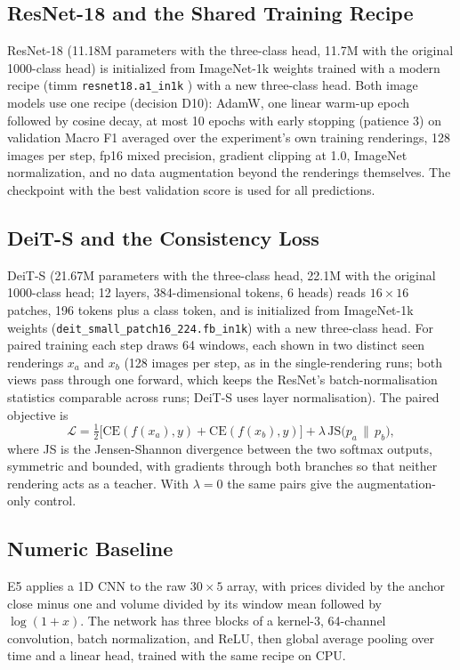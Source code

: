 \documentclass[10pt,journal,compsoc]{IEEEtran}
\begin{document}
\subsection{ResNet-18 and the Shared Training Recipe}
ResNet-18 \cite{he2016resnet} (11.18M parameters with the three-class head, 11.7M with the original 1000-class head) is initialized from ImageNet-1k weights trained with a modern recipe (timm \texttt{resnet18.a1\_in1k} \cite{wightman2019timm, wightman2021resnet}) with a new three-class head. Both image models use one recipe (decision D10): AdamW, one linear warm-up epoch followed by cosine decay, at most 10 epochs with early stopping (patience 3) on validation Macro F1 averaged over the experiment's own training renderings, 128 images per step, fp16 mixed precision, gradient clipping at 1.0, ImageNet normalization, and no data augmentation beyond the renderings themselves. The checkpoint with the best validation score is used for all predictions.

\subsection{DeiT-S and the Consistency Loss}
DeiT-S \cite{touvron2021deit} (21.67M parameters with the three-class head, 22.1M with the original 1000-class head; 12 layers, 384-dimensional tokens, 6 heads) reads $16 \times 16$ patches, 196 tokens plus a class token, and is initialized from ImageNet-1k weights (\texttt{deit\_small\_patch16\_224.fb\_in1k}) with a new three-class head. For paired training each step draws 64 windows, each shown in two distinct seen renderings $x_a$ and $x_b$ (128 images per step, as in the single-rendering runs; both views pass through one forward, which keeps the ResNet's batch-normalisation statistics comparable across runs; DeiT-S uses layer normalisation). The paired objective is
\begin{equation}
\mathcal{L} = \tfrac{1}{2}\big[\mathrm{CE}(f(x_a), y) + \mathrm{CE}(f(x_b), y)\big] + \lambda\,\mathrm{JS}\big(p_a \,\|\, p_b\big),
\end{equation}
where JS is the Jensen-Shannon divergence \cite{lin1991divergence} between the two softmax outputs, symmetric and bounded, with gradients through both branches so that neither rendering acts as a teacher. With $\lambda = 0$ the same pairs give the augmentation-only control.

\subsection{Numeric Baseline}
E5 applies a 1D CNN to the raw $30 \times 5$ array, with prices divided by the anchor close minus one and volume divided by its window mean followed by $\log(1+x)$. The network has three blocks of a kernel-3, 64-channel convolution, batch normalization, and ReLU, then global average pooling over time and a linear head, trained with the same recipe on CPU.
\end{document}
